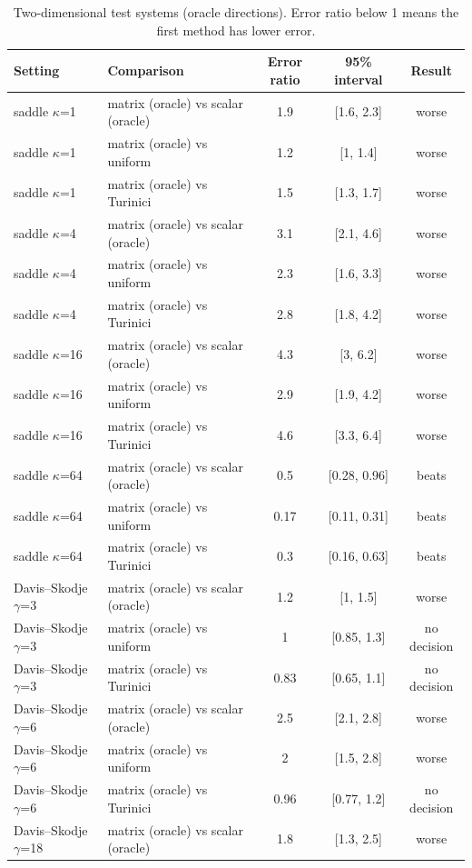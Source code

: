 \begin{table}[H]\centering\small
\caption{Two-dimensional test systems (oracle directions). Error ratio below 1 means the first method has lower error.}
\begin{tabular}{llccc}\toprule
Setting & Comparison & Error ratio & 95\% interval & Result\\\midrule
saddle $\kappa$=1 & matrix (oracle) vs scalar (oracle) & 1.9 & [1.6, 2.3] & worse\\
saddle $\kappa$=1 & matrix (oracle) vs uniform & 1.2 & [1, 1.4] & worse\\
saddle $\kappa$=1 & matrix (oracle) vs Turinici & 1.5 & [1.3, 1.7] & worse\\
saddle $\kappa$=4 & matrix (oracle) vs scalar (oracle) & 3.1 & [2.1, 4.6] & worse\\
saddle $\kappa$=4 & matrix (oracle) vs uniform & 2.3 & [1.6, 3.3] & worse\\
saddle $\kappa$=4 & matrix (oracle) vs Turinici & 2.8 & [1.8, 4.2] & worse\\
saddle $\kappa$=16 & matrix (oracle) vs scalar (oracle) & 4.3 & [3, 6.2] & worse\\
saddle $\kappa$=16 & matrix (oracle) vs uniform & 2.9 & [1.9, 4.2] & worse\\
saddle $\kappa$=16 & matrix (oracle) vs Turinici & 4.6 & [3.3, 6.4] & worse\\
saddle $\kappa$=64 & matrix (oracle) vs scalar (oracle) & 0.5 & [0.28, 0.96] & beats\\
saddle $\kappa$=64 & matrix (oracle) vs uniform & 0.17 & [0.11, 0.31] & beats\\
saddle $\kappa$=64 & matrix (oracle) vs Turinici & 0.3 & [0.16, 0.63] & beats\\
Davis--Skodje $\gamma$=3 & matrix (oracle) vs scalar (oracle) & 1.2 & [1, 1.5] & worse\\
Davis--Skodje $\gamma$=3 & matrix (oracle) vs uniform & 1 & [0.85, 1.3] & no decision\\
Davis--Skodje $\gamma$=3 & matrix (oracle) vs Turinici & 0.83 & [0.65, 1.1] & no decision\\
Davis--Skodje $\gamma$=6 & matrix (oracle) vs scalar (oracle) & 2.5 & [2.1, 2.8] & worse\\
Davis--Skodje $\gamma$=6 & matrix (oracle) vs uniform & 2 & [1.5, 2.8] & worse\\
Davis--Skodje $\gamma$=6 & matrix (oracle) vs Turinici & 0.96 & [0.77, 1.2] & no decision\\
Davis--Skodje $\gamma$=18 & matrix (oracle) vs scalar (oracle) & 1.8 & [1.3, 2.5] & worse\\

\end{tabular}
\end{table}
